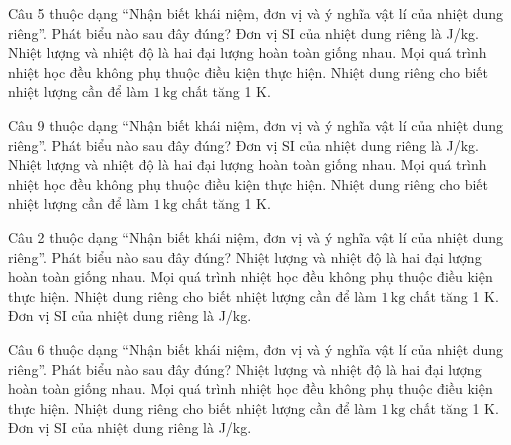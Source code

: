 \begin{ex}
Câu 5 thuộc dạng “Nhận biết khái niệm, đơn vị và ý nghĩa vật lí của nhiệt dung riêng”. Phát biểu nào sau đây đúng?
\choice
{Đơn vị SI của nhiệt dung riêng là J/kg.}
{Nhiệt lượng và nhiệt độ là hai đại lượng hoàn toàn giống nhau.}
{Mọi quá trình nhiệt học đều không phụ thuộc điều kiện thực hiện.}
{\True Nhiệt dung riêng cho biết nhiệt lượng cần để làm $1\,\text{kg}$ chất tăng 1 K.}
\end{ex}

\begin{ex}
Câu 9 thuộc dạng “Nhận biết khái niệm, đơn vị và ý nghĩa vật lí của nhiệt dung riêng”. Phát biểu nào sau đây đúng?
\choice
{Đơn vị SI của nhiệt dung riêng là J/kg.}
{Nhiệt lượng và nhiệt độ là hai đại lượng hoàn toàn giống nhau.}
{Mọi quá trình nhiệt học đều không phụ thuộc điều kiện thực hiện.}
{\True Nhiệt dung riêng cho biết nhiệt lượng cần để làm $1\,\text{kg}$ chất tăng 1 K.}
\end{ex}

\begin{ex}
Câu 2 thuộc dạng “Nhận biết khái niệm, đơn vị và ý nghĩa vật lí của nhiệt dung riêng”. Phát biểu nào sau đây đúng?
\choice
{Nhiệt lượng và nhiệt độ là hai đại lượng hoàn toàn giống nhau.}
{Mọi quá trình nhiệt học đều không phụ thuộc điều kiện thực hiện.}
{\True Nhiệt dung riêng cho biết nhiệt lượng cần để làm $1\,\text{kg}$ chất tăng 1 K.}
{Đơn vị SI của nhiệt dung riêng là J/kg.}
\end{ex}

\begin{ex}
Câu 6 thuộc dạng “Nhận biết khái niệm, đơn vị và ý nghĩa vật lí của nhiệt dung riêng”. Phát biểu nào sau đây đúng?
\choice
{Nhiệt lượng và nhiệt độ là hai đại lượng hoàn toàn giống nhau.}
{Mọi quá trình nhiệt học đều không phụ thuộc điều kiện thực hiện.}
{\True Nhiệt dung riêng cho biết nhiệt lượng cần để làm $1\,\text{kg}$ chất tăng 1 K.}
{Đơn vị SI của nhiệt dung riêng là J/kg.}
\end{ex}

